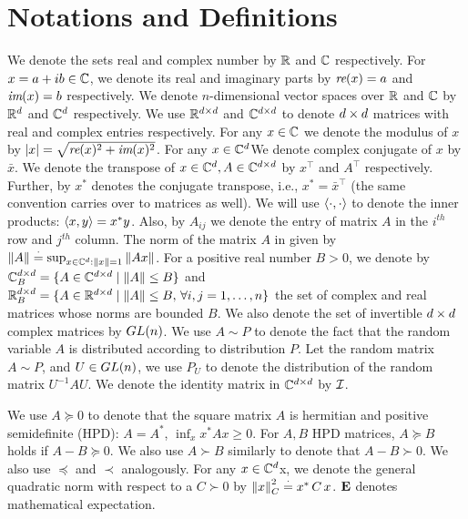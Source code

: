\section{Notations and Definitions}\label{sec:def}

We denote the sets real and complex number by $\mathbb{R}$ and $\mathbb{C}$ respectively. For $x=a+ib\in \mathbb{C}$, we denote its real and imaginary parts by $\emph{re}(x)=a$ and $\emph{im}(x)=b$ respectively. We denote $n$-dimensional vector spaces over $\mathbb{R}$ and $\mathbb{C}$ by $\mathbb{R}^{d}$ and $\mathbb{C}^{d}$ respectively. We use $\mathbb{R}^{d \times d}$ and $\mathbb{C}^{d \times d}$ to denote $d \times d$ matrices with real and complex entries respectively. For any $x\in \mathbb{C}$ we denote the modulus of $x$ by $\left|x\right|=\sqrt{\emph{re}(x)^2+\emph{im}(x)^2}$. For any $x\in \mathbb{C}^d$We denote complex conjugate of $x$ by $\bar{x}$. We denote the transpose of $x\in \mathbb{C}^{d}, A\in \mathbb{C}^{d \times d}$ by $x^\top$ and $A^\top$ respectively. Further, by $x^*$ denotes the conjugate transpose, i.e., $x^*=\bar{x}^\top$ (the same convention carries over to matrices as well). We will use $\langle\cdot,\cdot\rangle$ to denote the inner products: $\langle x,y\rangle=x^* y$. Also, by $A_{ij}$ we denote the entry of matrix $A$ in the $i^{th}$ row and $j^{th}$ column.
The norm of the matrix $A$ in given by $\left\| A\right\|\stackrel{\cdot}{=} \sup_{x\in \mathbb{C}^d:\left\| x\right\|=1} \left\| Ax\right\|$. For a positive real number $B>0$, we denote by $\mathbb{C}^{d \times d}_B=\{A\in \mathbb{C}^{d \times d}\mid \left\| A\right\|\leq B\}$ and  $\mathbb{R}^{d \times d}_B=\{A\in \mathbb{R}^{d \times d}\mid \left\| A\right\|\leq B,\,\forall i,j=1,\ldots,n\}$ the set of complex and real matrices whose norms are bounded $B$.
We also denote the set of invertible $d \times d$ complex matrices by $GL(n)$. We use $A\sim P$ to denote the fact that the random variable $A$ is distributed according to distribution $P$. Let the random matrix $A\sim P$, and $U\in GL(n)$, we use $P_U$ to denote the distribution of the random matrix $U^{-1}A U$.  We denote the identity matrix in $\mathbb{C}^{d \times d}$ by $\mathcal{I}$.

We use $A\succeq 0$ to denote that the
square matrix $A$ is hermitian and positive semidefinite (HPD):
$A = A^*$, $\inf_x x^* A x\ge 0$.
For $A,B$ HPD matrices, $A\succeq B$ holds if $A-B\succeq 0$.
We also use $A\succ B$ similarly to denote that $A-B \succ 0$.
We also use $\preceq$ and $\prec$ analogously. For any $x\in\mathbb{C}^d$x, we denote the general quadratic norm with respect to a $C\succ 0$ by $\left\| x\right\|^2_C\stackrel{\cdot}{=} x^*\, C \,x$.
$\mathbf{E}$ denotes mathematical expectation.

